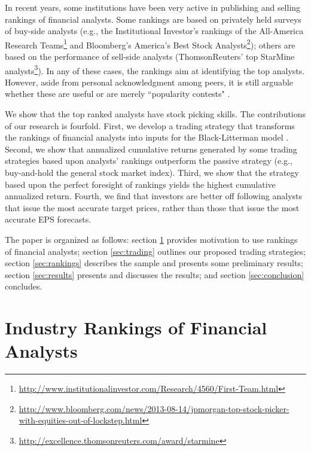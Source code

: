\documentclass{article}\usepackage[]{graphicx}\usepackage[]{color}
\begin{document}
In recent years, some institutions have been very active in publishing and  selling  rankings of financial analysts. Some rankings  are based on privately held surveys of  buy-side analysts (e.g., the Institutional Investor's rankings of the All-America Research Teams\footnote{\url{http://www.institutionalinvestor.com/Research/4560/First-Team.html}} and Bloomberg's America's Best Stock Analysts\footnote{\sloppy \url{http://www.bloomberg.com/news/2013-08-14/jpmorgan-top-stock-picker-with-equities-out-of-lockstep.html}}); others are based on the performance of sell-side analysts (ThomsonReuters' top StarMine analysts\footnote{\url{http://excellence.thomsonreuters.com/award/starmine}}). In any of these cases, the rankings aim at identifying the top analysts. However, aside from personal acknowledgment among peers, it is still arguable whether these are useful \citep{desai2000ass} or are merely ``popularity contests" \citep{emery2009}. %


We show that the top ranked analysts have stock picking skills. The contributions of our research is fourfold. First, we develop a trading strategy that transforms the rankings of financial analysts into inputs for the Black-Litterman model \citep{black1992}. Second, we show that annualized cumulative returns generated by some trading strategies  based upon analysts' rankings outperform the passive strategy (e.g., buy-and-hold the general stock market index). Third, we show that the strategy based upon the perfect foresight of rankings yields the highest cumulative annualized return. Fourth, we find that investors  are better off following analysts that issue the most accurate target prices, rather than those that issue the most accurate EPS forecasts.



The paper is organized as follows: section \ref{sec:ranking} provides motivation to use rankings of financial analysts; section \ref{sec:trading} outlines our proposed  trading strategies; section \ref{sec:rankings} describes the sample and presents some preliminary results; section \ref{sec:results} presents and discusses the results; and section \ref{sec:conclusion} concludes.

\section{Industry Rankings of Financial Analysts}
\label{sec:ranking}
\end{document}
